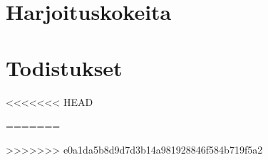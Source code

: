 \appendix

\chapter{Harjoituskokeita}



\chapter{Todistukset}





<<<<<<< HEAD

=======

>>>>>>> e0a1da5b8d9d7d3b14a981928846f584b719f5a2
